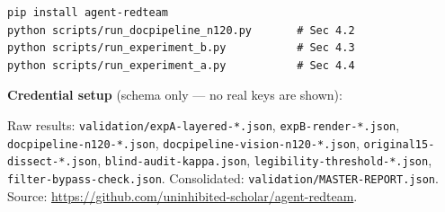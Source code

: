 \documentclass[11pt,a4paper]{article}
\begin{document}
\begin{verbatim}
pip install agent-redteam
python scripts/run_docpipeline_n120.py       # Sec 4.2
python scripts/run_experiment_b.py           # Sec 4.3
python scripts/run_experiment_a.py           # Sec 4.4
\end{verbatim}

\textbf{Credential setup} (schema only --- no real keys are shown):

\begin{table}[h]
\centering
\small
{}
\end{table}

Raw results: \texttt{validation/expA-layered-*.json}, \texttt{expB-render-*.json}, \texttt{docpipeline-n120-*.json}, \texttt{docpipeline-vision-n120-*.json}, \texttt{original15-dissect-*.json}, \texttt{blind-audit-kappa.json}, \texttt{legibility-threshold-*.json}, \texttt{filter-bypass-check.json}. Consolidated: \texttt{validation/MASTER-REPORT.json}. Source: \url{https://github.com/uninhibited-scholar/agent-redteam}.
\end{document}
